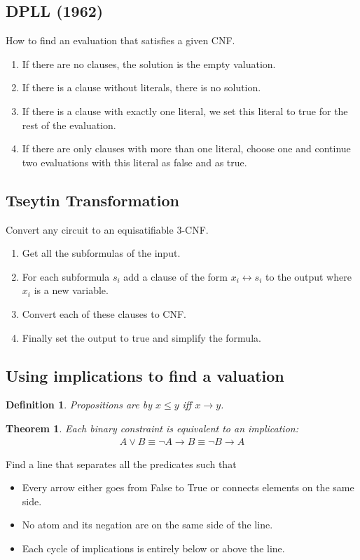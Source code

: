 \documentclass{article}
\theoremstyle{sltheorem}
\newtheorem{definition}{Definition}
\newtheorem{theorem}{Theorem}
\begin{document}
\subsection{DPLL (1962)}
How to find an evaluation that satisfies a given CNF.
\begin{enumerate}
    \item If there are no clauses, the solution is the empty valuation.
    \item If there is a clause without literals, there is no solution.
    \item If there is a clause with exactly one literal, we set this literal to true for the rest of the evaluation.
    \item If there are only clauses with more than one literal, choose one and continue two evaluations with this literal as false and as true.
\end{enumerate}
\subsection{Tseytin Transformation}
Convert any circuit to an equisatifiable 3-CNF.
\begin{enumerate}
    \item Get all the subformulas of the input.
    \item For each subformula $s_i$ add a clause of the form $x_i \leftrightarrow s_i$ to the output where $x_i$ is a new variable.
    \item Convert each of these clauses to CNF.
    \item Finally set the output to true and simplify the formula.
\end{enumerate}
\subsection{Using implications to find a valuation}
\begin{definition}
    Propositions are  by $x\leq y$ iff $x\to y$.
\end{definition}
\begin{theorem}
    Each binary constraint is equivalent to an implication:
    \begin{align*}
        A \vee B \equiv \neg A \to B \equiv \neg B \to A
    \end{align*}
\end{theorem}
\noindent Find a line that separates all the predicates such that
\begin{itemize}
    \item Every arrow either goes from False to True or connects elements on the same side.
    \item No atom and its negation are on the same side of the line.
    \item Each cycle of implications is entirely below or above the line.
\end{itemize}
\end{document}
